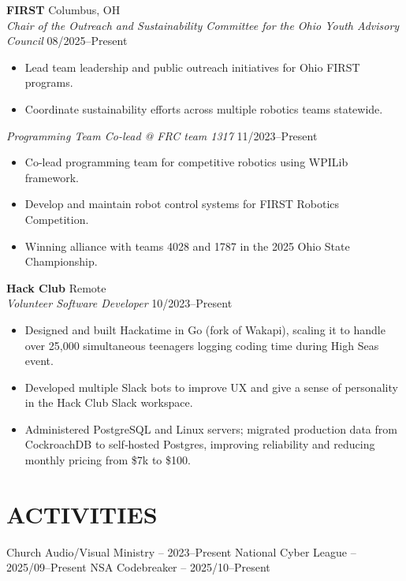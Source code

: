 \documentclass[a4paper,10pt]{article}
\newlength{\mpwidth}
\begin{document}
\textbf{FIRST} \hfill Columbus, OH\\
\textit{Chair of the Outreach and Sustainability Committee for the Ohio Youth Advisory Council} \hfill 08/2025--Present
\begin{minipage}{\mpwidth}
\begin{itemize}[nosep,after=\strut, leftmargin=1em, itemsep=3pt,label=--]
\item Lead team leadership and public outreach initiatives for Ohio FIRST programs.
\item Coordinate sustainability efforts across multiple robotics teams statewide.
\end{itemize}
\end{minipage}

\textit{Programming Team Co-lead @ FRC team 1317} \hfill 11/2023--Present
\begin{minipage}{\mpwidth}
\begin{itemize}[nosep,after=\strut, leftmargin=1em, itemsep=3pt,label=--]
\item Co-lead programming team for competitive robotics using WPILib framework.
\item Develop and maintain robot control systems for FIRST Robotics Competition.
\item Winning alliance with teams 4028 and 1787 in the 2025 Ohio State Championship.
\end{itemize}
\end{minipage}

\textbf{Hack Club} \hfill Remote\\
\textit{Volunteer Software Developer} \hfill 10/2023--Present
\begin{minipage}{\mpwidth}
\begin{itemize}[nosep,after=\strut, leftmargin=1em, itemsep=3pt,label=--]
\item Designed and built Hackatime in Go (fork of Wakapi), scaling it to handle over 25,000 simultaneous teenagers logging coding time during High Seas event.
\item Developed multiple Slack bots to improve UX and give a sense of personality in the Hack Club Slack workspace.
\item Administered PostgreSQL and Linux servers; migrated production data from CockroachDB to self‑hosted Postgres, improving reliability and reducing monthly pricing from \$7k to \$100.
\end{itemize}
\end{minipage}

\section{ACTIVITIES}
\begin{center}
{\small Church Audio/Visual Ministry -- 2023--Present \textbar{} National Cyber League -- 2025/09--Present \textbar{} NSA Codebreaker -- 2025/10--Present}
\end{center}

\vfill
{}
\end{document}

